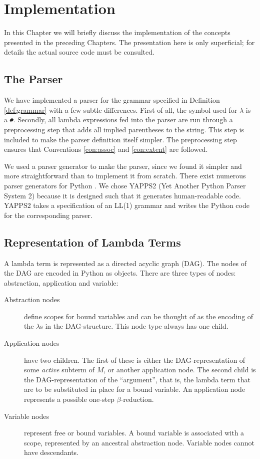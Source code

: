 
\chapter{Implementation}

In this Chapter we will briefly discuss the implementation of the concepts
presented in the preceding Chapters. The presentation here is only
superficial; for details the actual source code must be consulted.

\section{The Parser}

We have implemented a parser for the grammar specified in Definition
\ref{def:grammar} with a few subtle differences. First of all, the symbol used
for $\lambda$ is a \texttt{\#}. Secondly, all lambda expressions fed into the
parser are run through a preprocessing step that adds all implied parentheses
to the string. This step is included to make the parser definition itself
simpler. The preprocessing step ensures that Conventions \ref{con:assoc} and
\ref{con:extent} are followed.

We used a parser generator to make the parser, since we found it simpler and
more straightforward than to implement it from scratch. There exist numerous
parser generators for Python \cite{pythonParserGeneratorList}. We chose YAPPS2
(Yet Another Python Parser System 2) \cite{YAPPS2} because it is designed such
that it generates human-readable code. YAPPS2 takes a specification of an
LL(1) grammar and writes the Python code for the corresponding parser.

\section{Representation of Lambda Terms}

A lambda term is represented as a directed acyclic graph (DAG). The nodes of the
DAG are encoded in Python as objects. There are three types of nodes: 
abstraction, application and variable:
\begin{description}
	\item[Abstraction nodes] define scopes for bound variables and can be thought
	of as the encoding of the $\lambda$s in the DAG-structure. This node type
	always has one child.
	
	\item[Application nodes] have two children. The first of these
	is either the DAG-representation of some \emph{active} subterm of 
	$M$, or another application node. The second child is the DAG-representation
	of the ``argument'', that is, the lambda term that are to be substituted
	in place for a bound variable. An application node represents a possible
	one-step $\beta$-reduction.
	
	\item[Variable nodes] represent free or bound variables. A bound 
	variable is associated with a scope, represented by an ancestral
	abstraction node. Variable nodes cannot have descendants.
\end{description}

